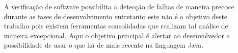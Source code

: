 A verifica\c{c}\~{a}o de software possibilita a detec\c{c}\~{a}o de falhas de maneira precoce durante as fases de desenvolvimento entretanto este n\~{a}o \'{e} o objetivo deste trabalho pois existem ferramentas consolidadas que realizam tal an\'{a}lise de maneira excepcional. Aqui o objetivo principal \'{e} alertar ao desenvolvedor a possibilidade de usar o que h\'{a} de mais recente na linguagem Java.






%
